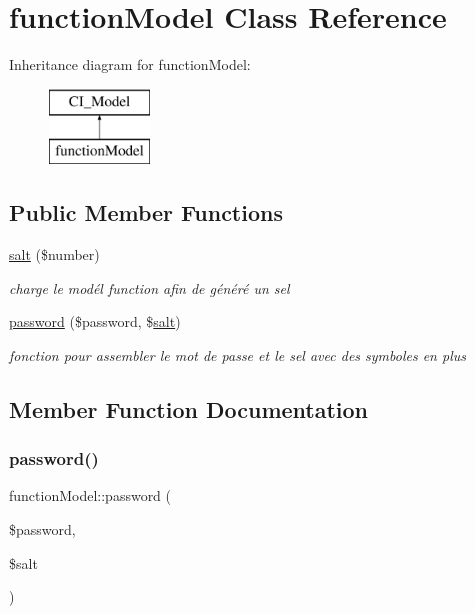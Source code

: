 \hypertarget{classfunction_model}{}\section{function\+Model Class Reference}
\label{classfunction_model}
Inheritance diagram for function\+Model\+:\begin{figure}[H]
\begin{center}
\leavevmode
\includegraphics[height=2.000000cm]{classfunction_model}
\end{center}
\end{figure}
\subsection*{Public Member Functions}
\begin{DoxyCompactItemize}
\item 
\mbox{\hyperlink{classfunction_model_acaffc7bb3def690818abb853e74d0e0a}{salt}} (\$number)
\begin{DoxyCompactList}\small\item\em charge le modél function afin de généré un sel \end{DoxyCompactList}\item 
\mbox{\hyperlink{classfunction_model_a5f35bed1bd602520737843dee7f47f23}{password}} (\$password, \$\mbox{\hyperlink{classfunction_model_acaffc7bb3def690818abb853e74d0e0a}{salt}})
\begin{DoxyCompactList}\small\item\em fonction pour assembler le mot de passe et le sel avec des symboles en plus \end{DoxyCompactList}\end{DoxyCompactItemize}


\subsection{Member Function Documentation}
\mbox{\label{classfunction_model_a5f35bed1bd602520737843dee7f47f23}} 
\subsubsection{\texorpdfstring{password()}{password()}}
{\footnotesize\ttfamily function\+Model\+::password (\begin{DoxyParamCaption}\item[{}]{\$password,  }\item[{}]{\$salt }\end{DoxyParamCaption})}



